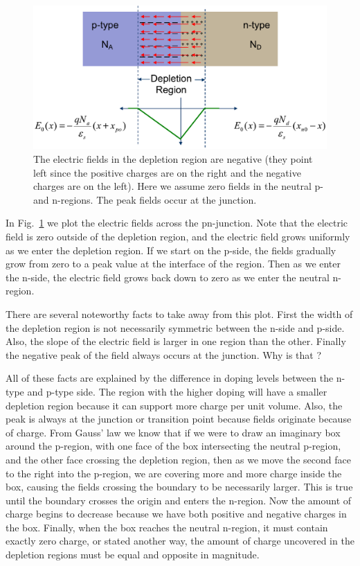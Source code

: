 \begin{figure}[tb]
\begin{center}
\includegraphics[width=.75\columnwidth]{slide18}
\end{center}
\caption{The electric fields in the depletion region are negative (they point left since the positive charges are on the right and the negative charges are on the left).  Here we assume zero fields in the neutral p- and n-regions.  The peak fields occur at the junction.  } \label{fig:slide18}
\end{figure}

In Fig.~\ref{fig:slide18} we plot the electric fields across the pn-junction.  Note that the electric field is zero outside of the depletion region, and the electric field grows uniformly as we enter the depletion region.  If we start on the p-side, the fields gradually grow from zero to a peak value at the interface of the region.  Then as we enter the n-side, the electric field grows back down to zero as we enter the neutral n-region.  

There are several noteworthy facts to take away from this plot.  First the width of the depletion region is not necessarily symmetric between the n-side and p-side.  Also, the slope of the electric field is larger in one region than the other.  Finally the negative peak of the field always occurs at the junction.  Why is that ?

All of these facts are explained by the difference in doping levels between the n-type and p-type side.  The region with the higher doping will have a smaller depletion region because it can support more charge per unit volume.  Also, the peak is always at the junction or transition point because fields originate because of charge.  From Gauss' law we know that if we were to draw an imaginary box around the p-region, with one face of the box intersecting the neutral p-region, and the other face crossing the depletion region, then as we move the second face to the right into the p-region, we are covering more and more charge inside the box, causing the fields crossing the boundary to be necessarily larger.  This is true until the boundary crosses the origin and enters the n-region.  Now the amount of charge begins to decrease because we have both positive and negative charges in the box.  Finally, when the box reaches the neutral n-region, it must contain exactly zero charge, or stated another way, the amount of charge uncovered in the depletion regions must be equal and opposite in magnitude.




